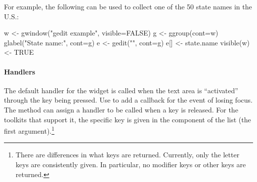 For example, the following can be used to collect one of the 50 state
names in the U.S.:
\begin{Schunk}
\begin{Sinput}
 w <- gwindow("gedit example", visible=FALSE) 
 g <- ggroup(cont=w)
 glabel("State name:", cont=g)
 e <- gedit("", cont=g)
 e[] <- state.name
 visible(w) <- TRUE
\end{Sinput}
\end{Schunk}

\paragraph{Handlers}
The default handler for the  widget is called when
the text area is ``activated'' through the  key being
pressed. Use  to add a callback for the event of
losing focus. The  method can
assign a handler to be called when a key is released. For the toolkits
that support it, the specific key is given in the  component
of the list  (the first argument).\footnote{There are
  differences in what keys are returned. Currently, only the letter
  keys are consistently given. In particular, no modifier keys or
  other keys are returned.}

